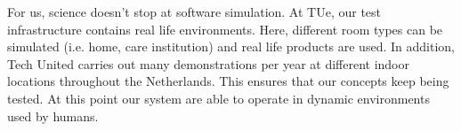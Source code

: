 For us, science doesn’t stop at software simulation. At TUe, our test infrastructure contains real life environments. Here, different room types can be simulated (i.e. home, care institution) and real life products are used. In addition, Tech United carries out many demonstrations per year at different indoor locations throughout the Netherlands. This ensures that our concepts keep being tested. At this point our system are able to operate in dynamic environments used by humans. 